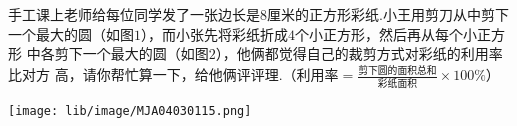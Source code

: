 手工课上老师给每位同学发了一张边长是$8$厘米的正方形彩纸.小王用剪刀从中剪下一个最大的圆（如图$1$），而小张先将彩纸折成$4$个小正方形，然后再从每个小正方形
中各剪下一个最大的圆（如图$2$），他俩都觉得自己的裁剪方式对彩纸的利用率比对方
高，请你帮忙算一下，给他俩评评理.（$\text{利用率}=\frac{\text{剪下圆的面积总和}}{\text{彩纸面积}}\times100\%$）

\begin{center}
    \texttt{[image: lib/image/MJA04030115.png]}
\end{center}